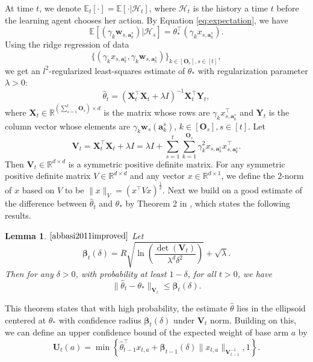 \documentclass{article}
\newcommand{\bbeta}{\boldsymbol{\beta}}
\newcommand{\EE}{\mathbb{E}}
\newcommand{\RR}{\mathbb{R}}
\newcommand{\ba}{\mathbf{a}}
\newcommand{\bO}{\mathbf{O}}
\newcommand{\bU}{\mathbf{U}}
\newcommand{\bV}{\mathbf{V}}
\newcommand{\bw}{\mathbf{w}}
\newcommand{\bX}{\mathbf{X}}
\newcommand{\bY}{\mathbf{Y}}
\newcommand{\cH}{\mathcal{H}}
\newcommand{\norm}[1]{\| #1 \|}
\newtheorem{lemma}[theorem]{Lemma}%
\begin{document}
At time $t$, we denote $\EE_t[\cdot] = \EE[\cdot | \cH_t]$, where $\cH_t$ is the history a time $t$ before the learning agent chooses her action. By Equation \eqref{eq:expectation}, we have 
$$
  \EE[(\gamma_k \bw_{s,\ba_k^s}) | \cH_{s}] = \theta_*^{\top} (\gamma_k x_{s,\ba_k^s}).
$$
Using the ridge regression of data 
$$
  \{(\gamma_k x_{s,\ba_k^s}, \gamma_k \bw_{s,\ba_k^s})\}_{k \in[\bO_s], s\in[t]},
$$
we get an $l^2$-regularized least-squares estimate of $\theta_*$ with regularization parameter $\lambda > 0$:
\begin{equation}
  \hat{\theta}_t = (\bX_t^{\top}\bX_t + \lambda I)^{-1} \bX_t^{\top} \bY_t,
\end{equation}
where $\bX_t \in \RR^{(\sum_{s=1}^{t}\bO_s) \times d}$ is the matrix whose rows are $\gamma_k x_{s,\ba_k^s}^{\top}$ and $\bY_t$ is the column vector whose elements are $\gamma_k \bw_s(\ba_k^s)$, $k \in[\bO_s], s\in[t]$. Let
$$
  \bV_t = \bX_t^{\top} \bX_t + \lambda I = \lambda I + \sum_{s=1}^{t} \sum_{k=1}^{\bO_s} \gamma_k^2 x_{s,\ba_k^s}x_{s,\ba_k^s}^{\top}.
$$
Then $\bV_t \in \RR^{d \times d}$ is a symmetric positive definite matrix. For any symmetric positive definite matrix $V \in \RR^{d \times d} $ and any vector $x \in \RR^{d \times 1}$, we define the $2$-norm of $x$ based on $V$ to be $\norm{x}_V = (x^{\top} V x)^{\frac{1}{2}}$. Next we build on a good estimate of the difference between $\hat{\theta}_t$ and $\theta_*$ by Theorem 2 in \cite{abbasi2011improved}, which states the following results.

\begin{lemma} $\mathrm{\cite{abbasi2011improved}}$ %
  \label{thm:theta_estimate}
  Let 
  \begin{equation}
    \bbeta_{t}(\delta) = R\sqrt{\ln\left(\frac{\det(\bV_{t})}{\lambda^d \delta^2}\right)} + \sqrt{\lambda}. \label{eq:definebeta}
  \end{equation}
  Then for any $\delta > 0$, with probability at least $1 - \delta$, for all $t > 0$, we have
  \begin{equation}
    \label{eq:estimateTheta}
    \norm{\hat{\theta}_t - \theta_{\ast}}_{\bV_{t}} \leq \bbeta_{t}(\delta).
  \end{equation}
\end{lemma}

This theorem states that with high probability, the estimate $\hat{\theta}$ lies in the ellipsoid centered at $\theta_*$ with confidence radius $\bbeta_t(\delta)$ under $\bV_t$ norm. 
Building on this, we can define an upper confidence bound of the expected weight of base arm $a$ by
\begin{equation}
  \label{eq:defU}
  \bU_t(a) = \min\left\{\hat{\theta}_{t-1}^{\top}x_{t,a} + \bbeta_{t-1}(\delta)\norm{x_{t,a}}_{\bV_{t-1}^{-1}}, 1 \right\}.
\end{equation}
\end{document}
